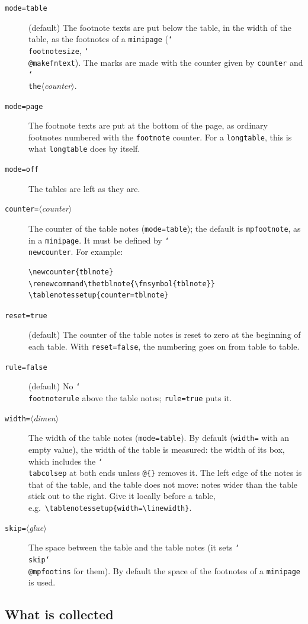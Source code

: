 \documentclass{article}
\newcommand*\cs[1]{\texttt{\char`\\#1}}
\newcommand*\key[1]{\texttt{#1}}
\newcommand*\meta[1]{$\langle$\textit{#1}$\rangle$}
\begin{document}
\begin{description}
\item[\key{mode=table}] (default) The footnote texts are put below the
  table, in the width of the table, as the footnotes of a
  \texttt{minipage} (\cs{footnotesize}, \cs{@makefntext}).  The marks
  are made with the counter given by \key{counter} and
  \cs{the}\meta{counter}.
\item[\key{mode=page}] The footnote texts are put at the bottom of the
  page, as ordinary footnotes numbered with the \texttt{footnote}
  counter.  For a \texttt{longtable}, this is what \texttt{longtable}
  does by itself.
\item[\key{mode=off}] The tables are left as they are.
\item[\key{counter=}\meta{counter}] The counter of the table notes
  (\key{mode=table}); the default is \texttt{mpfootnote}, as in a
  \texttt{minipage}.  It must be defined by \cs{newcounter}.  For
  example:
\begin{verbatim}
\newcounter{tblnote}
\renewcommand\thetblnote{\fnsymbol{tblnote}}
\tablenotessetup{counter=tblnote}
\end{verbatim}
\item[\key{reset=true}] (default) The counter of the table notes is
  reset to zero at the beginning of each table.  With
  \key{reset=false}, the numbering goes on from table to table.
\item[\key{rule=false}] (default) No \cs{footnoterule} above the table
  notes; \key{rule=true} puts it.
\item[\key{width=}\meta{dimen}] The width of the table notes
  (\key{mode=table}).  By default (\key{width=} with an empty value),
  the width of the table is measured: the width of its box, which
  includes the \cs{tabcolsep} at both ends unless \verb|@{}| removes
  it.  The left edge of the notes is that of the table, and the table
  does not move: notes wider than the table stick out to the right.
  Give it locally before a table, e.g.\
  \verb|\tablenotessetup{width=\linewidth}|.
\item[\key{skip=}\meta{glue}] The space between the table and the table
  notes (it sets \cs{skip}\cs{@mpfootins} for them).  By default the
  space of the footnotes of a \texttt{minipage} is used.
\end{description}

\subsection{What is collected}
\end{document}
